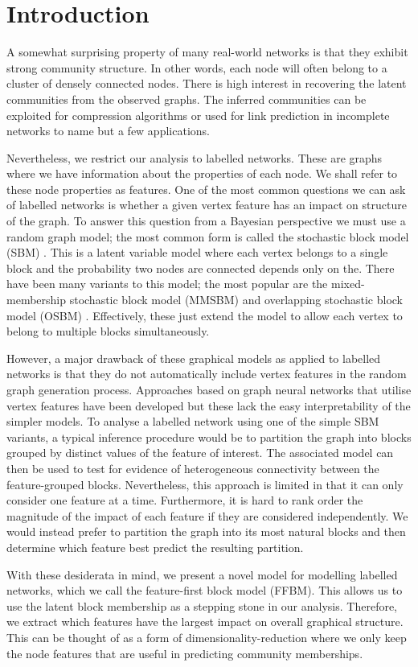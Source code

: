 \section{Introduction}

A somewhat surprising property of many real-world networks is that they exhibit strong community structure. In other words, each node will often belong to a cluster of densely connected nodes. There is high interest in recovering the latent communities from the observed graphs. The inferred communities can be exploited for compression algorithms \cite{cluster-compression} or used for link prediction in incomplete networks \cite{link-prediction} to name but a few applications.

Nevertheless, we restrict our analysis to labelled networks. These are graphs where we have information about the properties of each node. We shall refer to these node properties as features. One of the most common questions we can ask of labelled networks is whether a given vertex feature has an impact on structure of the graph. To answer this question from a Bayesian perspective we must use a random graph model; the most common form is called the stochastic block model (SBM) \cite{vanilla-sbm}. This is a latent variable model where each vertex belongs to a single block and the probability two nodes are connected depends only on the. There have been many variants to this model; the most popular are the mixed-membership stochastic block model (MMSBM) \cite{mixed-membership-sbm} and overlapping stochastic block model (OSBM) \cite{overlapping-sbm}. Effectively, these just extend the model to allow each vertex to belong to multiple blocks simultaneously.

However, a major drawback of these graphical models as applied to labelled networks is that they do not automatically include vertex features in the random graph generation process. Approaches based on graph neural networks \cite{sbm-gnn} that utilise vertex features have been developed but these lack the easy interpretability of the simpler models. To analyse a labelled network using one of the simple SBM variants, a typical inference procedure would be to partition the graph into blocks grouped by distinct values of the feature of interest. The associated model can then be used to test for evidence of heterogeneous connectivity between the feature-grouped blocks. Nevertheless, this approach is limited in that it can only consider one feature at a time. Furthermore, it is hard to rank order the magnitude of the impact of each feature if they are considered independently. We would instead prefer to partition the graph into its most natural blocks and then determine which feature best predict the resulting partition.

With these desiderata in mind, we present a novel model for modelling labelled networks, which we call the feature-first block model (FFBM). This allows us to use the latent block membership as a stepping stone in our analysis. Therefore, we extract which features have the largest impact on overall graphical structure. This can be thought of as a form of dimensionality-reduction where we only keep the node features that are useful in predicting community memberships.